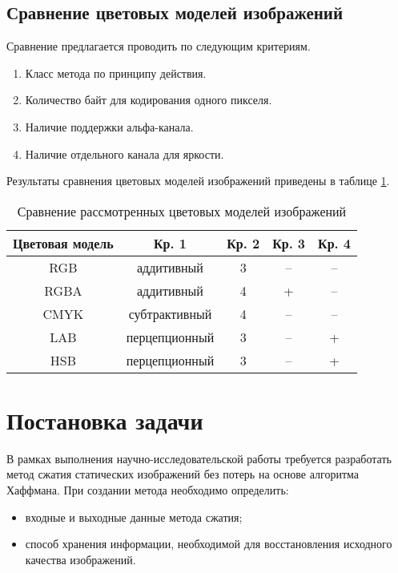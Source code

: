 \subsection{Сравнение цветовых моделей изображений}

Сравнение предлагается проводить по следующим критериям.
\begin{enumerate}
    \item Класс метода по принципу действия.
    \item Количество байт для кодирования одного пикселя.
    \item Наличие поддержки альфа-канала.
    \item Наличие отдельного канала для яркости.
\end{enumerate}

Результаты сравнения цветовых моделей изображений приведены в таблице \ref{tbl:color_models}.
\begin{table}[H]
    \centering
	\caption{Сравнение рассмотренных цветовых моделей изображений}
    \label{tbl:color_models}
	\begin{tabular}{|c|c|c|c|c|}
        \hline
        \textbf{Цветовая модель} & \textbf{Кр. 1} & \textbf{Кр. 2} & \textbf{Кр. 3} & \textbf{Кр. 4} \\ \hline
        RGB   & аддитивный    & 3 & -- & -- \\ \hline
        RGBA  & аддитивный    & 4 & +  & -- \\ \hline
        CMYK  & субтрактивный & 4 & -- & -- \\ \hline
        LAB   & перцепционный & 3 & -- & +  \\ \hline
        HSB   & перцепционный & 3 & -- & +  \\ \hline
    \end{tabular}
\end{table}

\section{Постановка задачи}

В рамках выполнения научно-исследовательской работы требуется разработать метод сжатия статических изображений без потерь на основе алгоритма Хаффмана. При создании метода необходимо определить:
\begin{itemize}
    \item входные и выходные данные метода сжатия;
    \item способ хранения информации, необходимой для восстановления исходного качества изображений.
\end{itemize}

